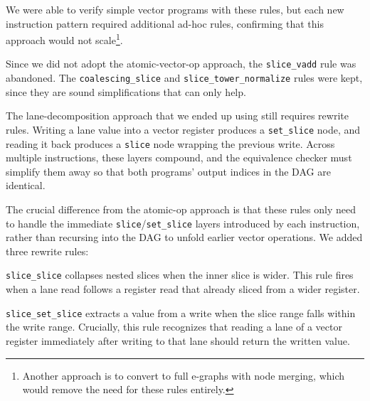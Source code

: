 We were able to verify simple vector programs with these rules, but each new instruction pattern required additional ad-hoc rules, confirming that this approach would not scale\footnote{Another approach is to convert to full e-graphs with node merging, which would remove the need for these rules entirely.}.

Since we did not adopt the atomic-vector-op approach, the \texttt{slice\_vadd} rule was abandoned.
The \texttt{coalescing\_slice} and \texttt{slice\_tower\_normalize} rules were kept, since they are sound simplifications that can only help.

The lane-decomposition approach that we ended up using still requires rewrite rules.
Writing a lane value into a vector register produces a \texttt{set\_slice} node, and reading it back produces a \texttt{slice} node wrapping the previous write.
Across multiple instructions, these layers compound, and the equivalence checker must simplify them away so that both programs' output indices in the DAG are identical.

The crucial difference from the atomic-op approach is that these rules only need to handle the immediate \texttt{slice}/\texttt{set\_slice} layers introduced by each instruction, rather than recursing into the DAG to unfold earlier vector operations.
We added three rewrite rules:

\texttt{slice\_slice} collapses nested slices when the inner slice is wider.
This rule fires when a lane read follows a register read that already sliced from a wider register.



\texttt{slice\_set\_slice} extracts a value from a write when the slice range falls within the write range. Crucially, this rule recognizes that reading a lane of a vector register immediately after writing to that lane should return the written value.


